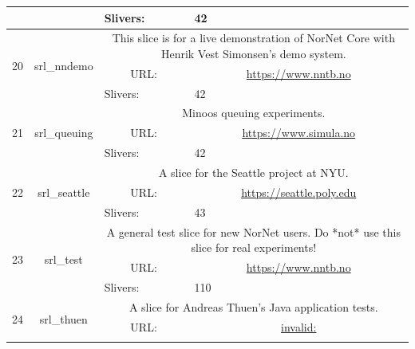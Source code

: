 \begin{small}
\begin{center}
\begin{longtable}{|c|c|c|c|}
  &  & \multicolumn{1}{|l|}{Slivers:} & \multicolumn{1}{|l|}{42} \\ \hline
 \multirow{3}{*}{20} & \multirow{3}{*}{\index{srl\_nndemo}\index{Slice!srl\_nndemo}srl\_nndemo} & \multicolumn{2}{|p{30em}|}{This slice is for a live demonstration of NorNet Core with Henrik Vest Simonsen's demo system.} \\* \cline{3-3}\cline{4-4}
  &  & \multicolumn{1}{|p{5em}|}{URL:} & \multicolumn{1}{|p{22.5em}|}{\url{https://www.nntb.no}} \\* \cline{3-3}\cline{4-4}
  &  & \multicolumn{1}{|l|}{Slivers:} & \multicolumn{1}{|l|}{42} \\ \hline
 \multirow{3}{*}{21} & \multirow{3}{*}{\index{srl\_queuing}\index{Slice!srl\_queuing}srl\_queuing} & \multicolumn{2}{|p{30em}|}{Minoos queuing experiments.} \\* \cline{3-3}\cline{4-4}
  &  & \multicolumn{1}{|p{5em}|}{URL:} & \multicolumn{1}{|p{22.5em}|}{\url{https://www.simula.no}} \\* \cline{3-3}\cline{4-4}
  &  & \multicolumn{1}{|l|}{Slivers:} & \multicolumn{1}{|l|}{42} \\ \hline
 \multirow{3}{*}{22} & \multirow{3}{*}{\index{srl\_seattle}\index{Slice!srl\_seattle}srl\_seattle} & \multicolumn{2}{|p{30em}|}{A slice for the Seattle project at NYU.} \\* \cline{3-3}\cline{4-4}
  &  & \multicolumn{1}{|p{5em}|}{URL:} & \multicolumn{1}{|p{22.5em}|}{\url{https://seattle.poly.edu}} \\* \cline{3-3}\cline{4-4}
  &  & \multicolumn{1}{|l|}{Slivers:} & \multicolumn{1}{|l|}{43} \\ \hline
 \multirow{3}{*}{23} & \multirow{3}{*}{\index{srl\_test}\index{Slice!srl\_test}srl\_test} & \multicolumn{2}{|p{30em}|}{A general test slice for new NorNet users. Do *not* use this slice for real experiments!} \\* \cline{3-3}\cline{4-4}
  &  & \multicolumn{1}{|p{5em}|}{URL:} & \multicolumn{1}{|p{22.5em}|}{\url{https://www.nntb.no}} \\* \cline{3-3}\cline{4-4}
  &  & \multicolumn{1}{|l|}{Slivers:} & \multicolumn{1}{|l|}{110} \\ \hline
 \multirow{3}{*}{24} & \multirow{3}{*}{\index{srl\_thuen}\index{Slice!srl\_thuen}srl\_thuen} & \multicolumn{2}{|p{30em}|}{A slice for Andreas Thuen's Java application tests.} \\* \cline{3-3}\cline{4-4}
  &  & \multicolumn{1}{|p{5em}|}{URL:} & \multicolumn{1}{|p{22.5em}|}{\url{invalid:}} \\* \cline{3-3}\cline{4-4}

\end{longtable}
\end{center}
\end{small}
